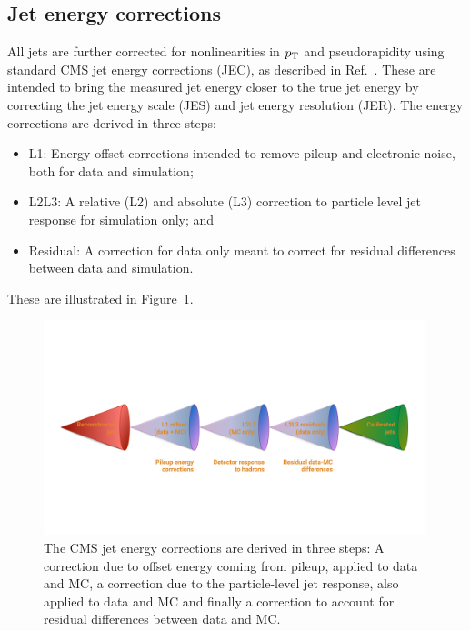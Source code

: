 \subsection{Jet energy corrections}
\label{sec:objreco:jec}
All jets are further corrected for nonlinearities in $p_{\mathrm{T}}$ and pseudorapidity using standard CMS jet energy corrections (JEC), as described in Ref.~\cite{jme_jinst}. These are intended to bring the measured jet energy closer to the true jet energy by correcting the jet energy scale (JES) and jet energy resolution (JER). The energy corrections are derived in three steps:
\begin{itemize}
  \itemsep0em 
  \item L1: Energy offset corrections intended to remove pileup and electronic noise, both for data and simulation;
  \item L2L3: A relative (L2) and absolute (L3) correction to particle level jet response for simulation only; and
  \item Residual: A correction for data only meant to correct for residual differences between data and simulation.
\end{itemize}

These are illustrated in Figure~\ref{fig:objreco:jec}.

\begin{figure}[h]
    \centering
    \includegraphics[width=0.99\textwidth]{figures/event_reconstruction/JEC.pdf}
    \caption{The CMS jet energy corrections are derived in three steps: A correction due to offset energy coming from pileup, applied to data and MC, a correction due to the particle-level jet response, also applied to data and MC and finally a correction to account for residual differences between data and MC.}
    \label{fig:objreco:jec}
\end{figure}

